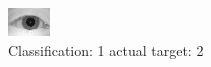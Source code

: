 \begin{figure}[h!]
\begin{center}
\includegraphics[width=0.60\columnwidth]{figures/ID1029_class_1_target_2.png}
\end{center}
\caption{ Classification: 1 actual target: 2}
\label{fig:ID1029_class_1_target_2}
\end{figure}
